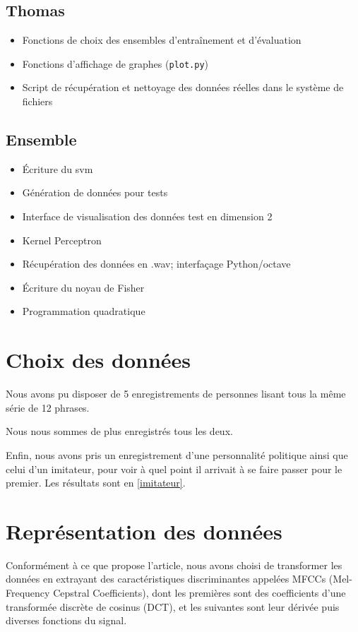 \documentclass{article}
\begin{document}
\subsection{Thomas}
\begin{itemize}
\item Fonctions de choix des ensembles d'entraînement et d'évaluation
\item Fonctions d'affichage de graphes (\texttt{plot.py})
\item Script de récupération et nettoyage des données réelles dans le système de fichiers
\end{itemize}

\subsection{Ensemble}
\begin{itemize}
\item Écriture du svm
\item Génération de données pour tests
\item Interface de visualisation des données test en dimension 2
\item Kernel Perceptron
\item Récupération des données en .wav; interfaçage Python/octave
\item Écriture du noyau de Fisher
\item Programmation quadratique
\end{itemize}


\section{Choix des données}
Nous avons pu disposer de 5 enregistrements de personnes lisant tous la même série de 12 phrases.

Nous nous sommes de plus enregistrés tous les deux.

Enfin, nous avons pris un enregistrement d'une personnalité politique ainsi que celui d'un imitateur, pour voir à quel point il arrivait à se faire passer pour le premier. Les résultats sont en \ref{imitateur}.
\section{Représentation des données}
\label{representation}
Conformément à ce que propose l'article, nous avons choisi de transformer les données en extrayant des caractéristiques discriminantes appelées MFCCs (Mel-Frequency Cepstral Coefficients), dont les premières sont des coefficients d'une transformée discrète de cosinus (DCT), et les suivantes sont leur dérivée puis diverses fonctions du signal.
\end{document}
